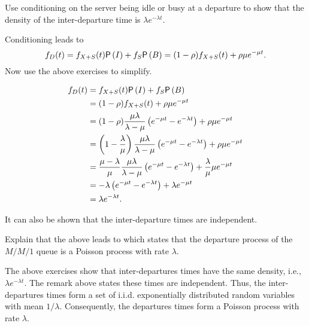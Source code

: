 \begin{exercise}
Use conditioning on the server being idle or busy at a departure to show that  the density of  the inter-departure time is $\lambda e^{-\lambda t}$.
  \begin{hint}
Conditioning leads to 
\begin{equation*}
    f_D(t) = f_{X+S}(t) \P{I} + f_S \P B = (1-\rho) f_{X+S}(t) +
    \rho \mu e^{-\mu t}.
\end{equation*}
    Now use the above exercises to simplify.
  \end{hint}
  \begin{solution}
       \begin{align*}
    f_D(t) 
&= f_{X+S}(t) \P I + f_S \P B \\
&= (1-\rho) f_{X+S}(t) +    \rho \mu e^{-\mu t} \\
&= (1-\rho) \frac{\mu\lambda}{\lambda-\mu} \left(e^{-\mu t}-e^{-\lambda t}\right) +    \rho \mu e^{-\mu t} \\
&= \left(1-\frac{\lambda}\mu\right) \frac{\mu\lambda}{\lambda-\mu}\left(e^{-\mu t}-e^{-\lambda t}\right)  +    \rho \mu e^{-\mu t} \\
&= \frac{\mu-\lambda}\mu \frac{\mu\lambda}{\lambda-\mu}\left(e^{-\mu t}-e^{-\lambda t}\right)  +    \frac\lambda \mu \mu e^{-\mu t} \\
&= - \lambda\left(e^{-\mu t}-e^{-\lambda t}\right)  +    \lambda e^{-\mu t} \\
&=  \lambda e^{-\lambda t}.
      \end{align*}
  \end{solution}
\end{exercise}

It can also be shown that the inter-departure times are independent. 

\begin{exercise}\label{ex:burke}
Explain that the above leads to   which states that the departure process of the $M/M/1$ queue is a Poisson  process with rate $\lambda$. 
\begin{solution}
The above exercises show that inter-departures times have the same density, i.e., $\lambda e^{-\lambda t}$. The remark above states these times are independent. Thus,  the inter-departures times form a set of i.i.d. exponentially distributed random variables with mean $1/\lambda$. Consequently, the departures times form a Poisson process with rate $\lambda$.
\end{solution}
\end{exercise}

